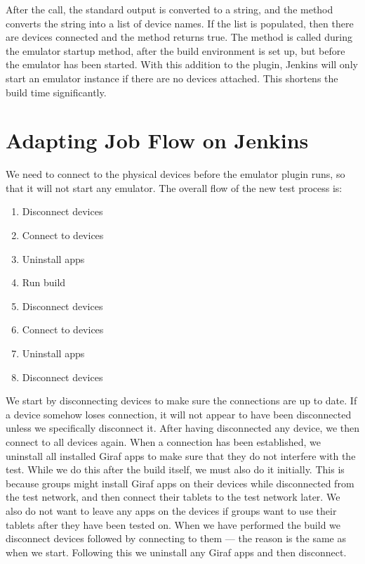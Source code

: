 After the call, the standard output is converted to a string, and the method  converts the string into a list of device names. If the list is populated, then there are devices connected and the method returns true. The method  is called during the emulator startup method, after the build environment is set up, but before the emulator has been started. With this addition to the plugin, Jenkins will only start an emulator instance if there are no devices attached. This shortens the build time significantly.

\section{Adapting Job Flow on Jenkins}\label{sec:adapting_job_flow}
We need to connect to the physical devices before the emulator plugin runs, so that it will not start any emulator. The overall flow of the new test process is:

\begin{multicols}{2}
\begin{enumerate}
  \item Disconnect devices
  \item Connect to devices
  \item Uninstall apps
  \item Run build
  \item Disconnect devices
  \item Connect to devices
  \item Uninstall apps
  \item Disconnect devices
\end{enumerate}
\end{multicols}

We start by disconnecting devices to make sure the connections are up to date. If a device somehow loses connection, it will not appear to have been disconnected unless we specifically disconnect it. After having disconnected any device, we then connect to all devices again. When a connection has been established, we uninstall all installed Giraf apps to make sure that they do not interfere with the test. While we do this after the build itself, we must also do it initially. This is because groups might install Giraf apps on their devices while disconnected from the test network, and then connect their tablets to the test network later. We also do not want to leave any apps on the devices if groups want to use their tablets after they have been tested on. When we have performed the build we disconnect devices followed by connecting to them --- the reason is the same as when we start. Following this we uninstall any Giraf apps and then disconnect.

